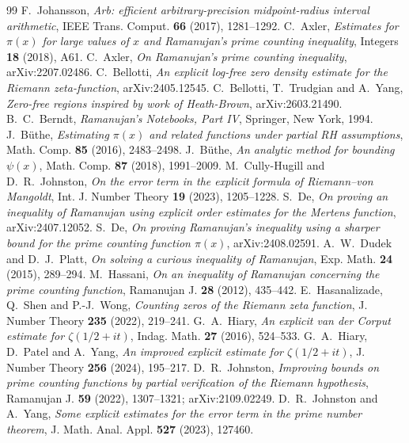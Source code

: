 \begin{thebibliography}{99}
 F.~Johansson, \emph{Arb: efficient arbitrary-precision midpoint-radius interval arithmetic}, IEEE Trans. Comput. \textbf{66} (2017), 1281--1292.
 C.~Axler, \emph{Estimates for $\pi(x)$ for large values of $x$ and Ramanujan's prime counting inequality}, Integers \textbf{18} (2018), A61.
 C.~Axler, \emph{On Ramanujan's prime counting inequality}, arXiv:2207.02486.
 C.~Bellotti, \emph{An explicit log-free zero density estimate for the Riemann zeta-function}, arXiv:2405.12545.
 C.~Bellotti, T.~Trudgian and A.~Yang, \emph{Zero-free regions inspired by work of Heath-Brown}, arXiv:2603.21490.
 B.~C.~Berndt, \emph{Ramanujan's Notebooks, Part IV}, Springer, New York, 1994.
 J.~B\"uthe, \emph{Estimating $\pi(x)$ and related functions under partial RH assumptions}, Math. Comp. \textbf{85} (2016), 2483--2498.
 J.~B\"uthe, \emph{An analytic method for bounding $\psi(x)$}, Math. Comp. \textbf{87} (2018), 1991--2009.
 M.~Cully-Hugill and D.~R.~Johnston, \emph{On the error term in the explicit formula of Riemann--von Mangoldt}, Int. J. Number Theory \textbf{19} (2023), 1205--1228.
 S.~De, \emph{On proving an inequality of Ramanujan using explicit order estimates for the Mertens function}, arXiv:2407.12052.
 S.~De, \emph{On proving Ramanujan's inequality using a sharper bound for the prime counting function $\pi(x)$}, arXiv:2408.02591.
 A.~W.~Dudek and D.~J.~Platt, \emph{On solving a curious inequality of Ramanujan}, Exp. Math. \textbf{24} (2015), 289--294.
 M.~Hassani, \emph{On an inequality of Ramanujan concerning the prime counting function}, Ramanujan J. \textbf{28} (2012), 435--442.
 E.~Hasanalizade, Q.~Shen and P.-J.~Wong, \emph{Counting zeros of the Riemann zeta function}, J. Number Theory \textbf{235} (2022), 219--241.
 G.~A.~Hiary, \emph{An explicit van der Corput estimate for $\zeta(1/2+it)$}, Indag. Math. \textbf{27} (2016), 524--533.
 G.~A.~Hiary, D.~Patel and A.~Yang, \emph{An improved explicit estimate for $\zeta(1/2+it)$}, J. Number Theory \textbf{256} (2024), 195--217.
 D.~R.~Johnston, \emph{Improving bounds on prime counting functions by partial verification of the Riemann hypothesis}, Ramanujan J. \textbf{59} (2022), 1307--1321; arXiv:2109.02249.
 D.~R.~Johnston and A.~Yang, \emph{Some explicit estimates for the error term in the prime number theorem}, J. Math. Anal. Appl. \textbf{527} (2023), 127460.

\end{thebibliography}
